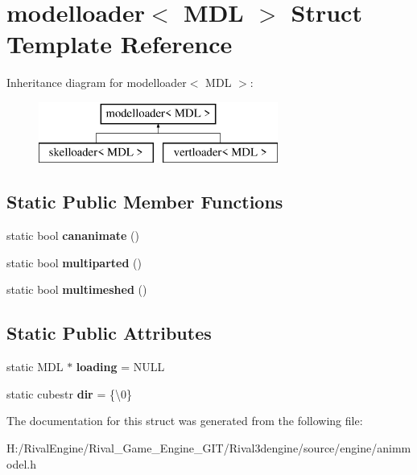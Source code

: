 \hypertarget{structmodelloader}{}\section{modelloader$<$ M\+DL $>$ Struct Template Reference}
\label{structmodelloader}
Inheritance diagram for modelloader$<$ M\+DL $>$\+:\begin{figure}[H]
\begin{center}
\leavevmode
\includegraphics[height=2.000000cm]{structmodelloader}
\end{center}
\end{figure}
\subsection*{Static Public Member Functions}
\begin{DoxyCompactItemize}
\item 
\mbox{\label{structmodelloader_afd48c27caefe0065dc155b10df01cd57}} 
static bool {\bfseries cananimate} ()
\item 
\mbox{\label{structmodelloader_a6100738e3e55322187f28c800a4dcbc2}} 
static bool {\bfseries multiparted} ()
\item 
\mbox{\label{structmodelloader_ad96345b3650b2bca60f2bad072409796}} 
static bool {\bfseries multimeshed} ()
\end{DoxyCompactItemize}
\subsection*{Static Public Attributes}
\begin{DoxyCompactItemize}
\item 
\mbox{\label{structmodelloader_a8550803562ecbd614d0392bcf58b4a5b}} 
static M\+DL $\ast$ {\bfseries loading} = N\+U\+LL
\item 
\mbox{\label{structmodelloader_ae2809a7fa3901dec094eafc622716ea7}} 
static cubestr {\bfseries dir} = \{\textquotesingle{}\textbackslash{}0\textquotesingle{}\}
\end{DoxyCompactItemize}


The documentation for this struct was generated from the following file\+:\begin{DoxyCompactItemize}
\item 
H\+:/\+Rival\+Engine/\+Rival\+\_\+\+Game\+\_\+\+Engine\+\_\+\+G\+I\+T/\+Rival3dengine/source/engine/animmodel.\+h\end{DoxyCompactItemize}
